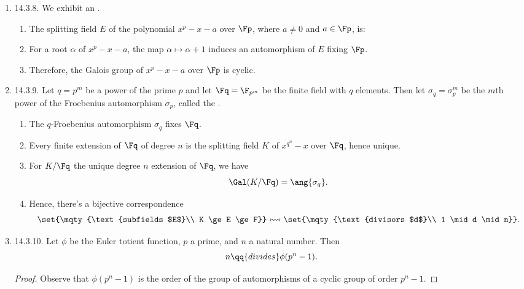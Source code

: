 \documentclass[onesided]{ccg-pset}
\begin{document}
\begin{enumerate}
\item \label{14.3.8} 14.3.8. We exhibit an .
\begin{enumerate}
    \item The splitting field $E$ of the polynomial $x^p - x -a$ over $\Fp$, where $a \neq 0$ and $a \in \Fp$, is:
    \item For a root $\alpha$ of $x^p - x -a$, the map $\alpha \mapsto \alpha + 1$ induces an automorphism of $E$ fixing $\Fp$.
    \item Therefore, the Galois group of $x^p - x -a$ over $\Fp$ is cyclic.
\end{enumerate}
 
\item \label{14.3.9} 14.3.9.
Let $q = p^m$ be a power of the prime $p$ and let $\Fq = \F_{p^m}$ be the finite field with $q$ elements. Then let $\sigma_q = \sigma_p^m$ be the $m$th power of the Froebenius automorphism $\sigma_p$, called the .

\begin{enumerate}
    \item The $q$-Froebenius automorphism $\sigma_q$ fixes $\Fq$.
    \item Every finite extension of $\Fq$ of degree $n$ is the splitting field $K$ of $x^{q^n} -x$ over $\Fq$, hence unique.
    \item For $K/\Fq$ the unique degree $n$ extension of $\Fq$, we have 
    \[
        \Gal(K/\Fq) = \ang{\sigma_q}
    .\]
    \item Hence, there's a bijective correspondence
    \[
        \set{\mqty{\text{subfields $E$}\\
                    K \ge E \ge F}} 
            \leftrightsquigarrow 
        \set{\mqty{\text{divisors $d$}\\
                   1 \mid d \mid n}}
    .\]
\end{enumerate}
 
\item \label{14.3.10} 14.3.10.
Let $\phi$ be the Euler totient function, $p$ a prime, and $n$ a natural number. Then
\[
    n \qq{divides} \phi(p^n -1)
.\]
\begin{proof}
    Observe that $\phi(p^n -1)$ is the order of the group of automorphisms of a cyclic group of order $p^n -1$.
\end{proof}

\end{enumerate}
\end{document}
